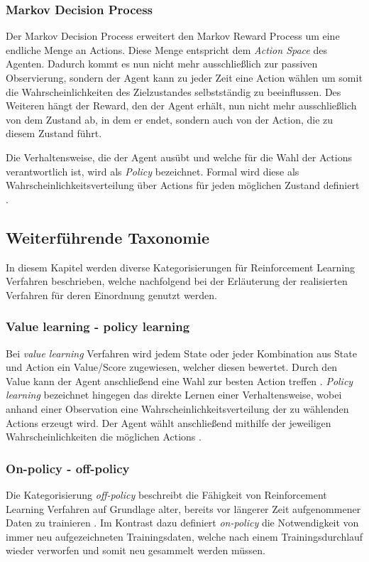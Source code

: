 \documentclass[11pt]{scrartcl}
\begin{document}
\subsubsection{Markov Decision Process}
Der Markov Decision Process erweitert den Markov Reward Process um eine endliche Menge an Actions.
Diese Menge entspricht dem \textit{Action Space} des Agenten. Dadurch kommt es nun nicht mehr
ausschließlich zur passiven Observierung, sondern der Agent kann zu jeder Zeit eine Action wählen um
somit die Wahrscheinlichkeiten des Zielzustandes selbstständig zu beeinflussen. Des Weiteren hängt 
der Reward, den der Agent erhält, nun nicht mehr ausschließlich von dem Zustand ab, in dem er endet,
sondern auch von der Action, die zu diesem Zustand führt. 

Die Verhaltensweise, die der Agent ausübt und welche für die Wahl der Actions verantwortlich ist,
wird als \textit{Policy} bezeichnet. Formal wird diese als Wahrscheinlichkeitsverteilung
über Actions für jeden möglichen Zustand definiert \cite[~S.22 f.]{L2018}. 


\subsection{Weiterführende Taxonomie}
In diesem Kapitel werden diverse Kategorisierungen für Reinforcement Learning Verfahren beschrieben,
welche nachfolgend bei der Erläuterung der realisierten Verfahren für deren Einordnung genutzt werden.  


\subsubsection{Value learning - policy learning}
Bei \textit{value learning} Verfahren wird jedem State oder jeder Kombination aus State und Action ein
Value/Score zugewiesen, welcher diesen bewertet. Durch den Value kann der Agent anschließend eine
Wahl zur besten Action treffen \cite[~S.NA]{L2018}. \textit{Policy learning} bezeichnet hingegen das
direkte Lernen einer Verhaltensweise, wobei anhand einer Observation eine Wahrscheinlichkeitsverteilung
der zu wählenden Actions erzeugt wird. Der Agent wählt anschließend mithilfe der jeweiligen
Wahrscheinlichkeiten die möglichen Actions \cite[~S.NA]{L2018}.


\subsubsection{On-policy - off-policy}
Die Kategorisierung \textit{off-policy} beschreibt die Fähigkeit von Reinforcement Learning Verfahren auf
Grundlage alter, bereits vor längerer Zeit aufgenommener Daten zu trainieren \cite[~S.NA]{L2018}. 
Im Kontrast dazu definiert \textit{on-policy} die Notwendigkeit von immer neu aufgezeichneten 
Trainingsdaten, welche nach einem Trainingsdurchlauf wieder verworfen und somit neu gesammelt
werden müssen.
\end{document}
